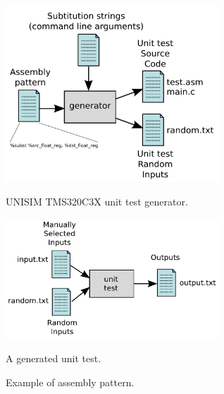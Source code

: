 \begin{figure}[!p]
	\begin{center}
		\begin{minipage}{\textwidth}
			\begin{minipage}{8.0cm}
				\begin{center}
					\includegraphics[width=8.0cm]{tms320c3x/fig_unit_test_generator.pdf}
					\caption{\label{fig:tms320c3x_unit_test_generator}UNISIM TMS320C3X unit test generator.}
				\end{center}
			\end{minipage}
			\begin{minipage}{8.0cm}
				\begin{center}
					\includegraphics[width=8.0cm]{tms320c3x/fig_unit_test.pdf}
					\caption{\label{fig:tms320c3x_unit_test} A generated unit test.}
				\end{center}
			\end{minipage}
		\end{minipage}
		\vspace{0.5cm}
		\begin{minipage}{\textwidth}
			\begin{center}
				
				\caption{\label{fig:tms320c3x_assembly_pattern} Example of assembly pattern.}
			\end{center}
		\end{minipage}
		\vspace{0.5cm}

\end{center}
\end{figure}
